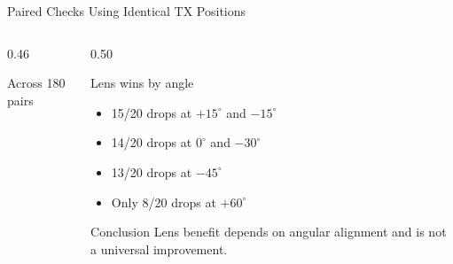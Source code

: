 \begin{frame}[t,shrink=10]{Paired Checks Using Identical TX Positions}
    \begin{columns}[T,onlytextwidth]
        \begin{column}{0.46\textwidth}
            \begin{block}{Across 180 pairs}
                \centering
            \end{block}
        \end{column}
        \begin{column}{0.50\textwidth}
            \begin{block}{Lens wins by angle}
                \begin{itemize}
                    \item 15/20 drops at $+15^\circ$ and $-15^\circ$
                    \item 14/20 drops at $0^\circ$ and $-30^\circ$
                    \item 13/20 drops at $-45^\circ$
                    \item Only 8/20 drops at $+60^\circ$
                \end{itemize}
            \end{block}
            \begin{alertblock}{Conclusion}
                Lens benefit depends on angular alignment and is not a
                universal improvement.
            \end{alertblock}
        \end{column}
    \end{columns}
\end{frame}

